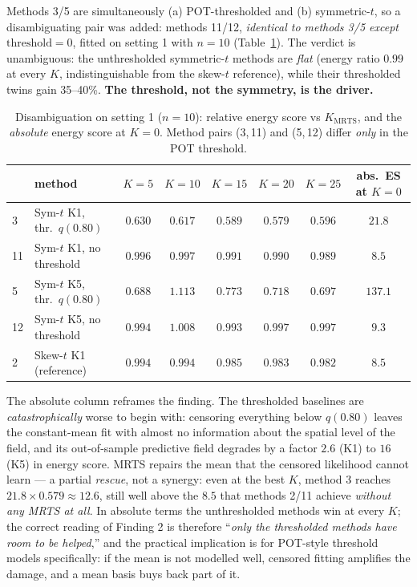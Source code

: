 \documentclass[11pt]{article}
\newcommand{\Kmrts}{K_{\mathrm{MRTS}}}
\begin{document}
Methods 3/5 are simultaneously (a) POT-thresholded and (b) symmetric-$t$, so a
disambiguating pair was added: methods 11/12, \emph{identical to methods 3/5
except} $\text{threshold} = 0$, fitted on setting 1 with $n = 10$
(Table~\ref{tab:disambig}). The verdict is unambiguous: the unthresholded
symmetric-$t$ methods are \emph{flat} (energy ratio $0.99$ at every $K$,
indistinguishable from the skew-$t$ reference), while their thresholded twins
gain 35--40\%. \textbf{The threshold, not the symmetry, is the driver.}

\begin{table}[ht]
\centering\small
\caption{Disambiguation on setting 1 ($n = 10$): relative energy score vs
$\Kmrts$, and the \emph{absolute} energy score at $K = 0$. Method pairs
(3,\,11) and (5,\,12) differ \emph{only} in the POT threshold.}
\label{tab:disambig}
\begin{tabular}{llccccc|c}
\toprule
 & method & $K{=}5$ & $K{=}10$ & $K{=}15$ & $K{=}20$ & $K{=}25$ & abs.\ ES at $K{=}0$ \\
\midrule
3  & Sym-$t$ K1, thr.\ $q(0.80)$ & $0.630$ & $0.617$ & $0.589$ & $\mathbf{0.579}$ & $0.596$ & $21.8$ \\
11 & Sym-$t$ K1, no threshold    & $0.996$ & $0.997$ & $0.991$ & $0.990$ & $0.989$ & $8.5$ \\
\midrule
5  & Sym-$t$ K5, thr.\ $q(0.80)$ & $0.688$ & $1.113$ & $0.773$ & $0.718$ & $\mathbf{0.697}$ & $137.1$ \\
12 & Sym-$t$ K5, no threshold    & $0.994$ & $1.008$ & $0.993$ & $0.997$ & $0.997$ & $9.3$ \\
\midrule
2  & Skew-$t$ K1 (reference)     & $0.994$ & $0.994$ & $0.985$ & $0.983$ & $0.982$ & $8.5$ \\
\bottomrule
\end{tabular}
\end{table}

The absolute column reframes the finding. The thresholded baselines are
\emph{catastrophically} worse to begin with: censoring everything below
$q(0.80)$ leaves the constant-mean fit with almost no information about the
spatial level of the field, and its out-of-sample predictive field degrades by
a factor $2.6$ (K1) to $16$ (K5) in energy score. MRTS repairs the mean that
the censored likelihood cannot learn --- a partial \emph{rescue}, not a
synergy: even at the best $K$, method 3 reaches
$21.8 \times 0.579 \approx 12.6$, still well above the $8.5$ that methods 2/11
achieve \emph{without any MRTS at all}. In absolute terms the unthresholded
methods win at every $K$; the correct reading of Finding 2 is therefore
``\emph{only the thresholded methods have room to be helped},'' and the
practical implication is for POT-style threshold models specifically: if the
mean is not modelled well, censored fitting amplifies the damage, and a mean
basis buys back part of it.
\end{document}
